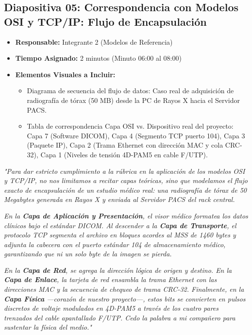 \documentclass[11pt,a4paper]{article}
\begin{document}
\newpage

\subsection{Diapositiva 05: Correspondencia con Modelos OSI y TCP/IP: Flujo de Encapsulación}
\begin{itemize}[leftmargin=*]
    \item \textbf{Responsable:} Integrante 2 (Modelos de Referencia)
    \item \textbf{Tiempo Asignado:} 2 minutos (Minuto 06:00 al 08:00)
    \item \textbf{Elementos Visuales a Incluir:}
    \begin{itemize}
        \item Diagrama de secuencia del flujo de datos: Caso real de adquisición de radiografía de tórax (50 MB) desde la PC de Rayos X hacia el Servidor PACS.
        \item Tabla de correspondencia Capa OSI vs. Dispositivo real del proyecto: Capa 7 (Software DICOM), Capa 4 (Segmento TCP puerto 104), Capa 3 (Paquete IP), Capa 2 (Trama Ethernet con dirección MAC y cola CRC-32), Capa 1 (Niveles de tensión 4D-PAM5 en cable F/UTP).
    \end{itemize}
\end{itemize}

\begin{tcolorbox}[colback=white,colframe=primaryblue,title=\textbf{Speech Verbal del Integrante 2 (Guion Palabra por Palabra)}]
\textit{"Para dar estricto cumplimiento a la rúbrica en la aplicación de los modelos OSI y TCP/IP, no nos limitamos a recitar capas teóricas, sino que modelamos el flujo exacto de encapsulación de un estudio médico real: una radiografía de tórax de 50 Megabytes generada en Rayos X y enviada al Servidor PACS del rack central.}\par\vspace{2mm}
\textit{En la \textbf{Capa de Aplicación y Presentación}, el visor médico formatea los datos clínicos bajo el estándar DICOM. Al descender a la \textbf{Capa de Transporte}, el protocolo TCP segmenta el archivo en bloques acordes al MSS de 1460 bytes y adjunta la cabecera con el puerto estándar 104 de almacenamiento médico, garantizando que ni un solo byte de la imagen se pierda.}\par\vspace{2mm}
\textit{En la \textbf{Capa de Red}, se agrega la dirección lógica de origen y destino. En la \textbf{Capa de Enlace}, la tarjeta de red ensambla la trama Ethernet con las direcciones MAC y la secuencia de chequeo de trama CRC-32. Finalmente, en la \textbf{Capa Física} —corazón de nuestro proyecto—, estos bits se convierten en pulsos discretos de voltaje modulados en 4D-PAM5 a través de los cuatro pares trenzados del cable apantallado F/UTP. Cedo la palabra a mi compañero para sustentar la física del medio."}
\end{tcolorbox}
\end{document}
